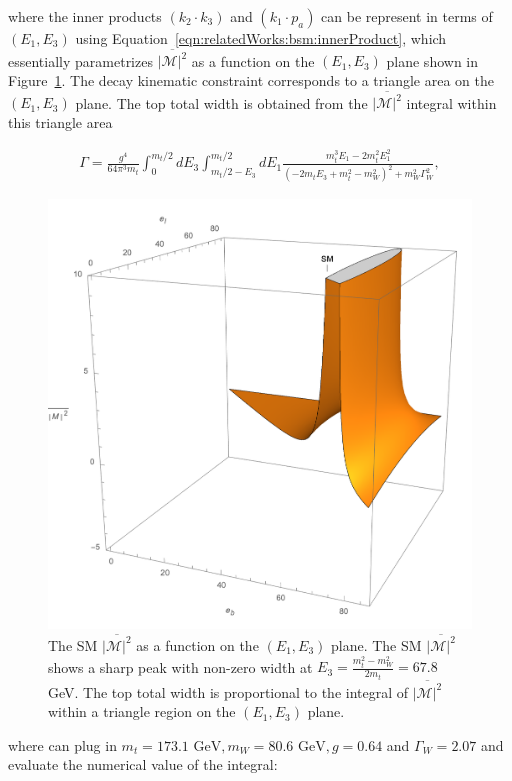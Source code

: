 \noindent where the inner products $(  k_2 \cdot k_3)$ and $ (  k_1 \cdot p_a) $ can be represent in terms of $(E_1,E_3)$ using Equation~\ref{eqn:relatedWorks:bsm:innerProduct}, which essentially parametrizes $\overline{ |\mathcal{M}|^2 } $ as a function on the $(E_1,E_3)$ plane shown in Figure~\ref{fig:relatedWorks:bsm:smTopDecay:smM2}. The decay kinematic constraint corresponds to a triangle area on the  $(E_1,E_3)$ plane. The top total width is obtained from the $\overline{ |\mathcal{M}|^2 } $ integral within this triangle area

\begin{equation}
    \begin{split}
         \Gamma = \frac{g^4}{64 \pi^3 m_t} \int_{0}^{m_t/2} d E_3 \int_{m_t/2-E_3}^{m_t/2} d E_1 \frac{m_t^3 E_1 - 2 m_t^2 E_1^2}{(-2 m_t E_3  + m_t^2  -m_W^2)^2 + m^2_W \Gamma^2_W},
    \end{split}
\end{equation}



\begin{figure}
\centering
    \includegraphics[width=0.4 \textwidth]{chapters/RelatedWorks/sectionBSM/figures/SM.png}
    \caption{The SM $\overline{ |\mathcal{M}|^2 } $ as a function on the $(E_1,E_3)$ plane. The SM $\overline{ |\mathcal{M}|^2 } $  shows a sharp peak with non-zero width at $E_3 = \frac{m^2_t - m^2_W}{2 m_t} = 67.8 $ GeV. The top total width is proportional to the integral of $\overline{ |\mathcal{M}|^2 } $ within a triangle region on the $(E_1,E_3)$ plane. }
    \label{fig:relatedWorks:bsm:smTopDecay:smM2}
\end{figure}







\noindent where can plug in $m_t= 173.1 \text{ GeV}, m_W= 80.6 \text{ GeV}, g=0.64 $  and $\Gamma_W = 2.07$ and evaluate the numerical value of the integral:

